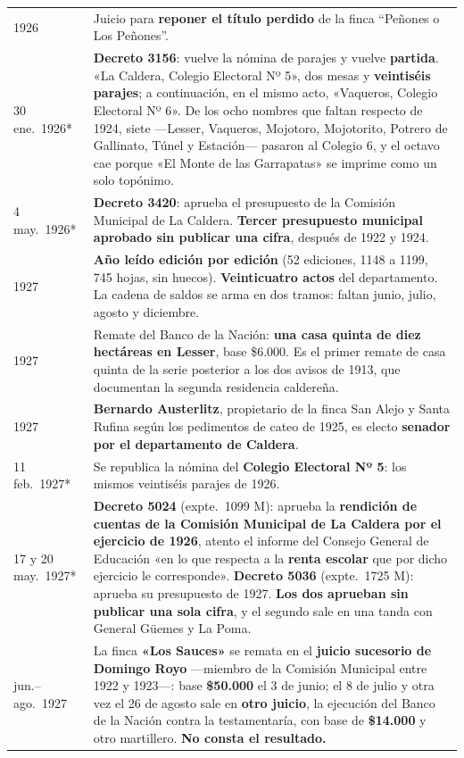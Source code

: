 \begin{longtable}{@{}p{2.7cm}p{10.3cm}@{}}
1926 & Juicio para \textbf{reponer el título perdido} de la finca ``Peñones o Los Peñones''. \\
30 ene.\ 1926* & \textbf{Decreto 3156}: vuelve la nómina de parajes y vuelve \textbf{partida}. «La Caldera, Colegio Electoral Nº 5», dos mesas y \textbf{veintiséis parajes}; a continuación, en el mismo acto, «Vaqueros, Colegio Electoral Nº 6». De los ocho nombres que faltan respecto de 1924, siete ---Lesser, Vaqueros, Mojotoro, Mojotorito, Potrero de Gallinato, Túnel y Estación--- pasaron al Colegio 6, y el octavo cae porque «El Monte de las Garrapatas» se imprime como un solo topónimo. \\
4 may.\ 1926* & \textbf{Decreto 3420}: aprueba el presupuesto de la Comisión Municipal de La Caldera. \textbf{Tercer presupuesto municipal aprobado sin publicar una cifra}, después de 1922 y 1924. \\
1927 & \textbf{Año leído edición por edición} (52 ediciones, 1148 a 1199, 745 hojas, sin huecos). \textbf{Veinticuatro actos} del departamento. La cadena de saldos se arma en dos tramos: faltan junio, julio, agosto y diciembre. \\
1927 & Remate del Banco de la Nación: \textbf{una casa quinta de diez hectáreas en Lesser}, base \$6.000. Es el primer remate de casa quinta de la serie posterior a los dos avisos de 1913, que documentan la segunda residencia caldereña. \\
1927 & \textbf{Bernardo Austerlitz\index{Austerlitz, Bernardo}}, propietario de la finca San Alejo y Santa Rufina según los pedimentos de cateo de 1925, es electo \textbf{senador por el departamento de Caldera}. \\
11 feb.\ 1927* & Se republica la nómina del \textbf{Colegio Electoral Nº 5}: los mismos veintiséis parajes de 1926. \\
17 y 20 may.\ 1927* & \textbf{Decreto 5024} (expte.\ 1099 M): aprueba la \textbf{rendición de cuentas de la Comisión Municipal de La Caldera por el ejercicio de 1926}, atento el informe del Consejo General de Educación «en lo que respecta a la \textbf{renta escolar} que por dicho ejercicio le corresponde». \textbf{Decreto 5036} (expte.\ 1725 M): aprueba su presupuesto de 1927. \textbf{Los dos aprueban sin publicar una sola cifra}, y el segundo sale en una tanda con General Güemes y La Poma. \\
jun.--ago.\ 1927 & La finca \textbf{«Los Sauces»} se remata en el \textbf{juicio sucesorio de Domingo Royo} ---miembro de la Comisión Municipal entre 1922 y 1923---: base \textbf{\$50.000} el 3 de junio; el 8 de julio y otra vez el 26 de agosto sale en \textbf{otro juicio}, la ejecución del Banco de la Nación contra la testamentaría, con base de \textbf{\$14.000} y otro martillero. \textbf{No consta el resultado.} \\

\end{longtable}
